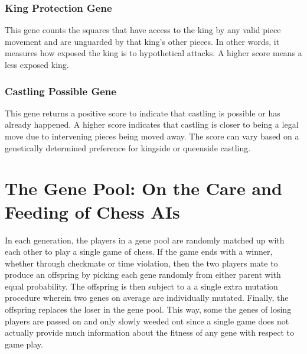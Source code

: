 \documentclass[letterpaper]{article}
\renewcommand\_{\textunderscore\allowbreak}
\begin{document}
\subsubsection{King Protection Gene}
This gene counts the squares that have access to the king by any valid piece movement and are unguarded by that king's other pieces. In other words, it measures how exposed the king is to hypothetical attacks. A higher score means a less exposed king.

\subsubsection{Castling Possible Gene}
This gene returns a positive score to indicate that castling is possible or has already happened. A higher score indicates that castling is closer to being a legal move due to intervening pieces being moved away. The score can vary based on a genetically determined preference for kingside or queenside castling.




\section{The Gene Pool: On the Care and Feeding of Chess AIs}

In each generation, the players in a gene pool are randomly matched up with each other to play a single game of chess. If the game ends with a winner, whether through checkmate or time violation, then the two players mate to produce an offspring by picking each gene randomly from either parent with equal probability. The offspring is then subject to a a single extra mutation procedure wherein two genes on average are individually mutated. Finally, the offspring replaces the loser in the gene pool. This way, some the genes of losing players are passed on and only slowly weeded out since a single game does not actually provide much information about the fitness of any gene with respect to game play.
\end{document}

